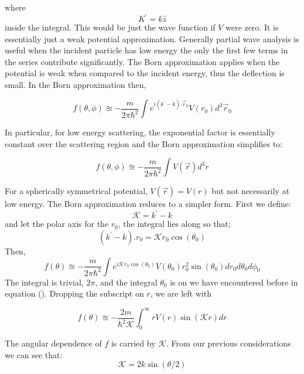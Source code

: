 where
$$K^{'}= k \hat{z}$$
inside the integral. This would be just the wave function if $V$ were zero. It is essentially just a weak potential approximation. Generally partial wave analysis is useful when the incident particle has low energy the only the first few terms in the series contribute significantly. The Born approximation applies when the potential is weak when compared to the incident energy, thus the deflection is small. In the Born approximation then,
\begin{tcolorbox}
	\begin{equation}
		f(\theta, \phi) \approxeq -\frac{m}{2 \pi \hbar^{2}} \int e^{i(k^{'}-k). \vec{r}_{0}}V({r}_{0})d^{3}\vec{r}_{0}
	\end{equation}
\end{tcolorbox}
In particular, for low energy scattering, the exponential factor is essentially constant over the scattering region and the Born approximation simplifies to:
\begin{tcolorbox}
	\begin{equation}
		f(\theta, \phi) \approxeq -\frac{m}{2 \pi \hbar^{2}} \int V(\vec{r}) d^{3}r
	\end{equation}
\end{tcolorbox}
For a spherically symmetrical potential, $V(\vec{r}) = V(r)$ but not necessarily at low energy. The Born approximation reduces to a simpler form. First we define:
\begin{equation}
\mathcal{K} = k^{'} - k
\end{equation}
and let the polar axis for the $r_{0}$, the integral lies along so that;
\begin{equation}
(k^{'} - k).r_{0} = \mathcal{K}r_{0} \cos(\theta_{0})
\end{equation}
Then,
\begin{equation}
f(\theta) \approxeq -\frac{m}{2 \pi \hbar^{2}} \int e^{i \mathcal{K} r_{0} \cos(\theta_{0})} V(\theta_{0}) r^{2}_{0} \sin(\theta_{0}) dr_{0}d \theta_{0} d \phi_{0}
\end{equation}
The integral is trivial, $2\pi$, and the integral $\theta_{0}$ is on we have encountered before in equation (). Dropping the subscript on $r$, we are left with
\begin{tcolorbox}
\begin{equation}
f(\theta) \approxeq -\frac{2m}{\hbar^{2} \mathcal{K}} \int_{0}^{\infty} rV(r)\sin(\mathcal{K}r) dr
\end{equation}
\end{tcolorbox}
The angular dependence of $f$ is carried by $\mathcal{K}$. From our previous considerations we can see that:
\begin{equation}
\mathcal{K} = 2k \sin(\theta /2)
\end{equation}
